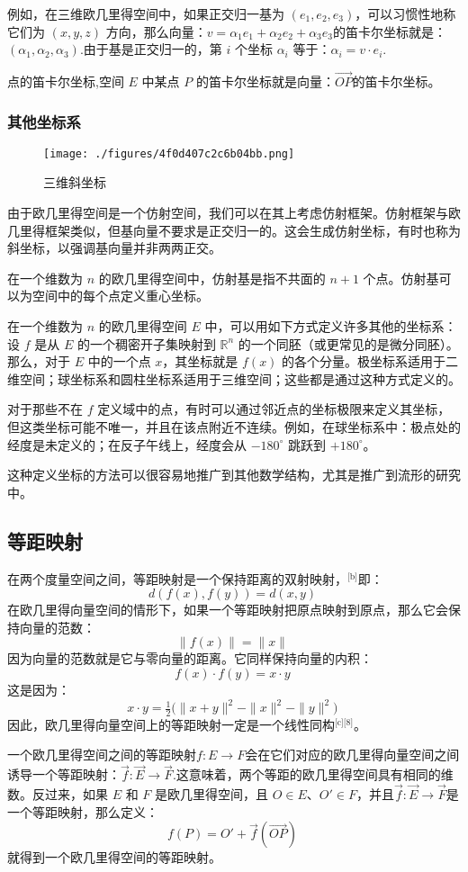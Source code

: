 例如，在三维欧几里得空间中，如果正交归一基为 $(e_1, e_2, e_3)$，可以习惯性地称它们为 $(x, y, z)$ 方向，那么向量：$v = \alpha_1 e_1 + \alpha_2 e_2 + \alpha_3 e_3$的笛卡尔坐标就是：$(\alpha_1, \alpha_2, \alpha_3)$.由于基是正交归一的，第 $i$ 个坐标 $\alpha_i$ 等于：$\alpha_i = v \cdot e_i$.

点的笛卡尔坐标,空间 $E$ 中某点 $P$ 的笛卡尔坐标就是向量：$\overrightarrow{OP}$的笛卡尔坐标。
\subsubsection{其他坐标系}
\begin{figure}[ht]
\centering
\texttt{[image: ./figures/4f0d407c2c6b04bb.png]}
\caption{三维斜坐标} \label{fig_OJLDkj_4}
\end{figure}
由于欧几里得空间是一个仿射空间，我们可以在其上考虑仿射框架。仿射框架与欧几里得框架类似，但基向量不要求是正交归一的。这会生成仿射坐标，有时也称为斜坐标，以强调基向量并非两两正交。

在一个维数为 $n$ 的欧几里得空间中，仿射基是指不共面的 $n+1$ 个点。仿射基可以为空间中的每个点定义重心坐标。

在一个维数为 $n$ 的欧几里得空间 $E$ 中，可以用如下方式定义许多其他的坐标系：设 $f$ 是从 $E$ 的一个稠密开子集映射到 $\mathbb{R}^n$ 的一个同胚（或更常见的是微分同胚）。那么，对于 $E$ 中的一个点 $x$，其坐标就是 $f(x)$ 的各个分量。极坐标系适用于二维空间；球坐标系和圆柱坐标系适用于三维空间；这些都是通过这种方式定义的。

对于那些不在 $f$ 定义域中的点，有时可以通过邻近点的坐标极限来定义其坐标，但这类坐标可能不唯一，并且在该点附近不连续。例如，在球坐标系中：极点处的经度是未定义的；在反子午线上，经度会从 $-180^\circ$ 跳跃到 $+180^\circ$。

这种定义坐标的方法可以很容易地推广到其他数学结构，尤其是推广到流形的研究中。
\subsection{等距映射}
在两个度量空间之间，等距映射是一个保持距离的双射映射，\(^\text{[b]}\)即：
$$
d(f(x), f(y)) = d(x, y)~
$$
在欧几里得向量空间的情形下，如果一个等距映射把原点映射到原点，那么它会保持向量的范数：
$$
\|f(x)\| = \|x\|~
$$
因为向量的范数就是它与零向量的距离。它同样保持向量的内积：
$$
f(x) \cdot f(y) = x \cdot y~
$$
这是因为：
$$
x \cdot y = \tfrac{1}{2} \big(\|x + y\|^2 - \|x\|^2 - \|y\|^2\big)~
$$
因此，欧几里得向量空间上的等距映射一定是一个线性同构\(^\text{[c][8]}\)。

一个欧几里得空间之间的等距映射$f: E \to F$会在它们对应的欧几里得向量空间之间诱导一个等距映射：$\overrightarrow{f}: \overrightarrow{E}\to \overrightarrow{F}$.这意味着，两个等距的欧几里得空间具有相同的维数。反过来，如果 $E$ 和 $F$ 是欧几里得空间，且 $O \in E$、$O' \in F$，并且$\overrightarrow{f}: \overrightarrow{E} \to \overrightarrow{F}$是一个等距映射，那么定义：
$$
f(P) = O' + \overrightarrow{f}(\overrightarrow{OP})~
$$
就得到一个欧几里得空间的等距映射。

